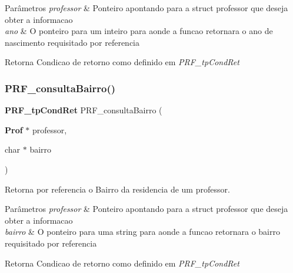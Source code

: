 \begin{DoxyParams}{Parâmetros}
{\em professor} & Ponteiro apontando para a struct professor que deseja obter a informacao \\
\hline
{\em ano} & O ponteiro para um inteiro para aonde a funcao retornara o ano de nascimento requisitado por referencia \\
\hline
\end{DoxyParams}
\begin{DoxyReturn}{Retorna}
Condicao de retorno como definido em {\itshape P\+R\+F\+\_\+tp\+Cond\+Ret} 
\end{DoxyReturn}
\mbox{\label{group__modulo_professor_gab2fb73bef414349be7908fc2cd1eef92}} 
\subsubsection{P\+R\+F\+\_\+consulta\+Bairro()}
{\footnotesize\ttfamily \textbf{ P\+R\+F\+\_\+tp\+Cond\+Ret} P\+R\+F\+\_\+consulta\+Bairro (\begin{DoxyParamCaption}\item[{\textbf{ Prof} $\ast$}]{professor,  }\item[{char $\ast$}]{bairro }\end{DoxyParamCaption})}



Retorna por referencia o Bairro da residencia de um professor. 


\begin{DoxyParams}{Parâmetros}
{\em professor} & Ponteiro apontando para a struct professor que deseja obter a informacao \\
\hline
{\em bairro} & O ponteiro para uma string para aonde a funcao retornara o bairro requisitado por referencia \\
\hline
\end{DoxyParams}
\begin{DoxyReturn}{Retorna}
Condicao de retorno como definido em {\itshape P\+R\+F\+\_\+tp\+Cond\+Ret} 
\end{DoxyReturn}
\mbox{\label{group__modulo_professor_ga2de6ca98fdf2c21b329dec040d49429f}} 
